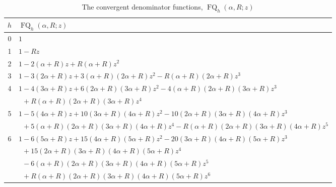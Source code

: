 \documentclass[12pt,reqno]{article}
\numberwithin{sfootnote}{section}
\newcommand{\subtablewidth}{\textwidth}
\newcommand{\subtableskip}{\bigskip}
\newcommand{\tabletopstrut}[0]{\rule{0pt}{3ex}}
\numberwithin{equation}{section}
\theoremstyle{plain}
\theoremstyle{definition}
\theoremstyle{remark}
\newcommand{\ConvFQ}[4]{\ensuremath{\FQ_{#1}\left(#2, #3; #4\right)}}
\DeclareMathOperator{\FQ}{FQ}
\begin{document}
\begin{table}[h]
\begin{subtable}{\subtablewidth}
\begin{tabular}{|c|l|} \hline 
\hline\tabletopstrut 
$h$ & $\ConvFQ{h}{\alpha}{R}{z}$ \\ \hline 
0 & $1$ \\ 
1 & $1-Rz$ \\ 
2 & $1 - 2 (\alpha + R) z + R (\alpha + R) z^2$ \\ 
3 & $1 - 3 (2 \alpha + R) z + 3 (\alpha + R) (2 \alpha + R) z^2 - 
      R (\alpha + R) (2 \alpha + R) z^3$ \\ 
4 & $1 - 4 (3 \alpha + R) z + 6 (2 \alpha + R) (3 \alpha + R) z^2 - 
       4 (\alpha + R) (2 \alpha + R) (3 \alpha + R) z^3$ \\ 
  & $\phantom{1 } + 
     R (\alpha + R) (2 \alpha + R) (3 \alpha + R) z^4$ \\ 
5 & $1 - 5 (4 \alpha + R) z + 10 (3 \alpha + R) (4 \alpha + R) z^2 - 
     10 (2 \alpha + R) (3 \alpha + R) (4 \alpha + R) z^3$ \\ 
  & $\phantom{1 } + 
     5 (\alpha + R) (2 \alpha + R) (3 \alpha + R) (4 \alpha + R) z^4 - 
     R (\alpha + R) (2 \alpha + R) (3 \alpha + R) (4 \alpha + R) z^5$ \\ 
6 & $1 - 6 (5 \alpha + R) z + 15 (4 \alpha + R) (5 \alpha + R) z^2 - 
     20 (3 \alpha + R) (4 \alpha + R) (5 \alpha + R) z^3$ \\ 
  & $\phantom{1 } + 
     15 (2 \alpha + R) (3 \alpha + R) (4 \alpha + R) (5 \alpha + R) z^4$ \\ 
  & $\phantom{1 } - 
     6 (\alpha + R) (2 \alpha + R) (3 \alpha + R) (4 \alpha + R) 
     (5 \alpha + R) z^5$ \\ 
  & $\phantom{1 } + 
     R (\alpha + R) (2 \alpha + R) (3 \alpha + R) (4 \alpha + R) 
     (5 \alpha + R) z^6$ \\ \hline 
\hline 
\end{tabular} 

\caption{The convergent denominator functions, $\ConvFQ{h}{\alpha}{R}{z}$} 

\subtableskip 


\end{subtable}
\end{table}
\end{document}
